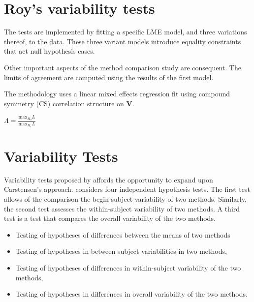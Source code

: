 \documentclass[12pt, a4paper]{report}
\theoremstyle{plain}
\theoremstyle{definition}
\theoremstyle{remark}
\begin{document}
\section{Roy's variability tests}


The tests are implemented by fitting a specific LME model, and three variations thereof, to the data. These three variant models introduce equality constraints that act null hypothesis cases.

Other important aspects of the method comparison study are consequent. The limits of agreement are computed using the results of the first model.




The methodology uses a linear mixed effects regression fit using
compound symmetry (CS) correlation structure on \textbf{V}.


$\Lambda = \frac{\mbox{max}_{H_{0}}L}{\mbox{max}_{H_{1}}L}$











\section{Variability Tests}


Variability tests proposed by \citet{ARoy2009} affords the opportunity to expand upon Carstensen's approach. \citet{ARoy2009} considers four independent hypothesis tests. The first test allows of the comparison the begin-subject variability of two methods. Similarly, the second test assesses the within-subject variability of two methods. A third test is a test that compares the overall variability of the two methods.
\begin{itemize}
	\item Testing of hypotheses of differences between the means of
	two methods\item Testing of hypotheses in between subject
	variabilities in two methods, \item Testing of hypotheses of
	differences in within-subject variability of the two methods,
	\item Testing of hypotheses in differences in overall variability
	of the two methods.
\end{itemize}
\end{document}
